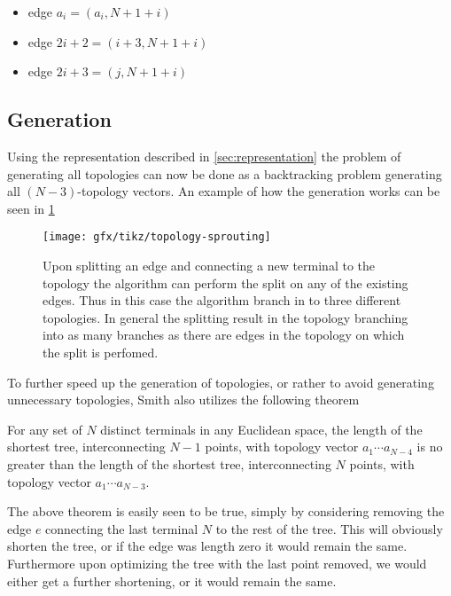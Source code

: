 \begin{itemize}
\item edge $a_{i} = (a_{i},N+1+i)$
\item edge $ 2i + 2 = (i+3,N+1+i)$
\item edge $ 2i + 3 = (j,N+1+i)$
\end{itemize}


\subsection{Generation}
\label{sec:generation}

Using the representation described in \cref{sec:representation} the problem of
generating all topologies can now be done as a backtracking problem generating
all $(N-3)$-topology vectors. An example of how the generation works can be seen
in \cref{fig:topology-sprouting}

\begin{figure}[htbp]
  \centering
  \texttt{[image: gfx/tikz/topology-sprouting]}
  \caption[Splitting of an edge]{Upon splitting an edge and connecting a new
    terminal to the topology the algorithm can perform the split on any of the
    existing edges. Thus in this case the algorithm branch in to three
    different topologies. In general the splitting result in the topology
    branching into as many branches as there are edges in the topology on which
    the split is perfomed.\label{fig:topology-sprouting}}
\end{figure}

To further speed up the generation of topologies, or rather to avoid generating
unnecessary topologies, Smith also utilizes the following theorem
%
\begin{theorem}
  For any set of $N$ distinct terminals in any Euclidean space, the length of
  the shortest tree, interconnecting $N-1$ points, with topology vector
  $a_1 \cdots a_{N-4}$ is no greater than the length of the shortest tree,
  interconnecting $N$ points, with topology vector $a_1 \cdots a_{N-3}$.
\end{theorem}
%
The above theorem is easily seen to be true, simply by considering removing the
edge $e$ connecting the last terminal $N$ to the rest of the tree. This will
obviously shorten the tree, or if the edge was length zero it would remain the
same. Furthermore upon optimizing the tree with the last point removed, we
would either get a further shortening, or it would remain the same.

